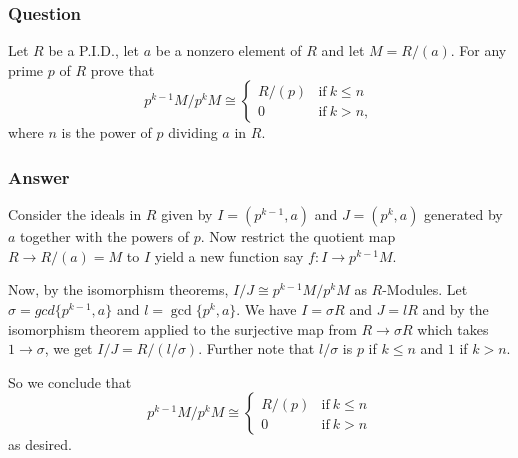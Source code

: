 \documentclass[12pt]{article}
\begin{document}
\subsubsection{Question}
Let $R$ be a P.I.D., let $a$ be a nonzero element of $R$ and let $M = R / (a)$. For any prime $p$ of $R$ prove that
\[p^{k-1}M / p^k M \cong \left\{ \begin{array}{ll} 
R/(p) & \mathrm{if\ }k \leq n\\
0& \mathrm{if\ }k>n,
 \end{array}\right. \]
 where $n$ is the power of $p$ dividing $a$ in $R$.
\subsubsection{Answer}
Consider the ideals in $R$ given by $I = (p^{k-1},a)$ and $J=(p^k,a)$ generated by $a$ together with the powers of $p$. Now restrict the quotient map $R \to R/(a) = M$ to $I$ yield a new function say $f:I \to p^{k-1}M$. 

Now, by the isomorphism theorems, $I/J \cong p^{k-1} M /p^k M$ as $R$-Modules. Let $\sigma = gcd\{p^{k-1},a\}$ and $l = \gcd\{p^k,a\}$. We have $I = \sigma R$ and $J = l R$ and by the isomorphism theorem applied to the surjective map from $R \to \sigma R$ which takes $1 \to \sigma$, we get $I / J = R/(l/\sigma)$. Further note that $l /  \sigma$ is $p$ if $k \leq n$ and $1$ if $k >n$. 

So we conclude that 
\[p^{k-1}M / p^k M \cong \left\{ \begin{array}{ll} 
R/(p) & \mathrm{if\ }k \leq n\\
0& \mathrm{if\ }k>n
 \end{array}\right. \]
 as desired.
\end{document}

